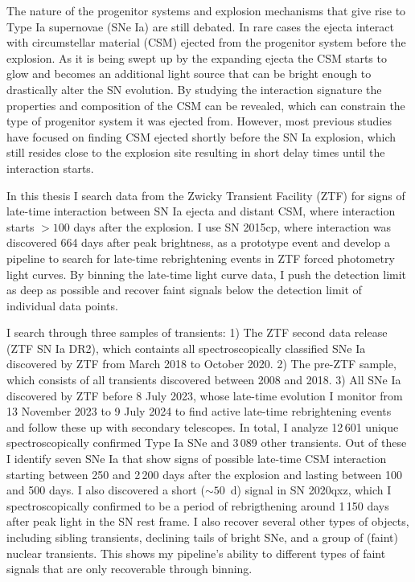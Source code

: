 

\begin{abstracts} 
The nature of the progenitor systems and explosion mechanisms that give rise to Type Ia supernovae (SNe Ia) are still debated. In rare cases the ejecta interact with circumstellar material (CSM) ejected from the progenitor system before the explosion. As it is being swept up by the expanding ejecta the CSM starts to glow and becomes an additional light source that can be bright enough to drastically alter the SN evolution. By studying the interaction signature the properties and composition of the CSM can be revealed, which can constrain the type of progenitor system it was ejected from. However, most previous studies have focused on finding CSM ejected shortly before the SN Ia explosion, which still resides close to the explosion site resulting in short delay times until the interaction starts.

In this thesis I search data from the Zwicky Transient Facility (ZTF) for signs of late-time interaction between SN Ia ejecta and distant CSM, where interaction starts $>100$ days after the explosion. I use SN 2015cp, where interaction was discovered 664 days after peak brightness, as a prototype event and develop a pipeline to search for late-time rebrightening events in ZTF forced photometry light curves. By binning the late-time light curve data, I push the detection limit as deep as possible and recover faint signals below the detection limit of individual data points.

I search through three samples of transients: 1) The ZTF second data release (ZTF SN Ia DR2), which containts all spectroscopically classified SNe Ia discovered by ZTF from March 2018 to October 2020. 2) The pre-ZTF sample, which consists of all transients discovered between 2008 and 2018. 3) All SNe Ia discovered by ZTF before 8 July 2023, whose late-time evolution I monitor from 13 November 2023 to 9 July 2024 to find active late-time rebrightening events and follow these up with secondary telescopes. In total, I analyze 12\,601 unique spectroscopically confirmed Type Ia SNe and 3\,089 other transients. Out of these I identify seven SNe Ia that show signs of possible late-time CSM interaction starting between 250 and 2\,200 days after the explosion and lasting between 100 and 500 days. I also discovered a short ($\sim50$~d) signal in SN 2020qxz, which I spectroscopically confirmed to be a period of rebrigthening around 1\,150 days after peak light in the SN rest frame. I also recover several other types of objects, including sibling transients, declining tails of bright SNe, and a group of (faint) nuclear transients. This shows my pipeline's ability to different types of faint signals that are only recoverable through binning.


\end{abstracts}
